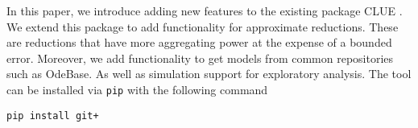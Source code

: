 In this paper, we introduce \ToolName adding new features to the existing package CLUE \cite{ovchinnikov_clue_2021,jimenez_clue_2022}.
We extend this package to add functionality for approximate reductions.
These are reductions that have more aggregating power at the expense of a bounded error\cite{leguizamon-robayo_approximate_2023}. 
Moreover, we add functionality to get models from common repositories such as OdeBase\cite{}. 
As well as simulation support for exploratory analysis.
The tool can be installed via \texttt{pip} with the following command

\texttt{pip install git+\RepoURL}










